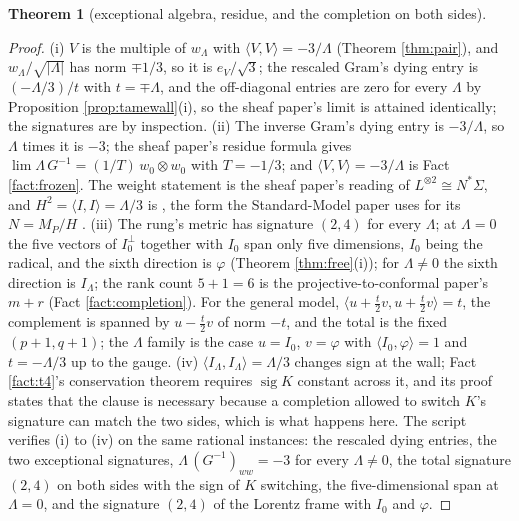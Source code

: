 \documentclass[11pt]{article}
\newtheorem{theorem}{Theorem}[section]
\theoremstyle{definition}
\newcommand{\ip}[2]{\langle #1, #2\rangle}
\begin{document}
\begin{theorem}[exceptional algebra, residue, and the completion on both sides]
\begin{enumerate}
\end{enumerate}
\end{theorem}

\begin{proof}
(i) $V$ is the multiple of $w_{\Lambda}$ with $\ip{V}{V} = -3/\Lambda$ (Theorem \ref{thm:pair}), and $w_{\Lambda}/\sqrt{|\Lambda|}$ has norm $\mp 1/3$, so it is $e_{V}/\sqrt 3$; the rescaled Gram's dying entry is $(-\Lambda/3)/t$ with $t = \mp\Lambda$, and the off-diagonal entries are zero for every $\Lambda$ by Proposition \ref{prop:tamewall}(i), so the sheaf paper's limit is attained identically; the signatures are by inspection. (ii) The inverse Gram's dying entry is $-3/\Lambda$, so $\Lambda$ times it is $-3$; the sheaf paper's residue formula gives $\lim \Lambda\, G^{-1} = (1/T)\,w_{0} \otimes w_{0}$ with $T = -1/3$; and $\ip{V}{V} = -3/\Lambda$ is Fact \ref{fact:frozen}. The weight statement is the sheaf paper's reading of $L^{\otimes 2} \cong N^{*}\Sigma$, and $H^{2} = \ip{I}{I} = \Lambda/3$ is \cite[Fact~2.5]{ButlerT12}, the form the Standard-Model paper uses for its $N = M_{P}/H$ \cite[Obs.~7.1]{ButlerT12}. (iii) The rung's metric has signature $(2,4)$ for every $\Lambda$; at $\Lambda = 0$ the five vectors of $I_{0}^{\perp}$ together with $I_{0}$ span only five dimensions, $I_{0}$ being the radical, and the sixth direction is $\varphi$ (Theorem \ref{thm:free}(i)); for $\Lambda \neq 0$ the sixth direction is $I_{\Lambda}$; the rank count $5 + 1 = 6$ is the projective-to-conformal paper's $m + r$ (Fact \ref{fact:completion}). For the general model, $\ip{u + \tfrac{t}{2}v}{u + \tfrac{t}{2}v} = t$, the complement is spanned by $u - \tfrac{t}{2}v$ of norm $-t$, and the total is the fixed $(p+1,q+1)$; the $\Lambda$ family is the case $u = I_{0}$, $v = \varphi$ with $\ip{I_{0}}{\varphi} = 1$ and $t = -\Lambda/3$ up to the gauge. (iv) $\ip{I_{\Lambda}}{I_{\Lambda}} = \Lambda/3$ changes sign at the wall; Fact \ref{fact:t4}'s conservation theorem requires $\operatorname{sig} K$ constant across it, and its proof states that the clause is necessary because a completion allowed to switch $K$'s signature can match the two sides, which is what happens here. The script verifies (i) to (iv) on the same rational instances: the rescaled dying entries, the two exceptional signatures, $\Lambda\,(G^{-1})_{ww} = -3$ for every $\Lambda \neq 0$, the total signature $(2,4)$ on both sides with the sign of $K$ switching, the five-dimensional span at $\Lambda = 0$, and the signature $(2,4)$ of the Lorentz frame with $I_{0}$ and $\varphi$.
\end{proof}
\end{document}
